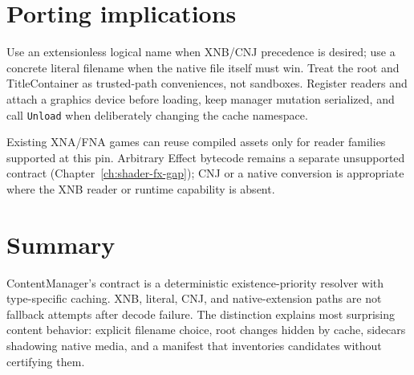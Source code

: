 \section{Porting implications}

Use an extensionless logical name when XNB/CNJ precedence is desired; use a concrete literal
filename when the native file itself must win. Treat the root and TitleContainer as trusted-path
conveniences, not sandboxes. Register readers and attach a graphics device before loading, keep
manager mutation serialized, and call \texttt{Unload} when deliberately changing the cache
namespace.

Existing XNA/FNA games can reuse compiled assets only for reader families supported at this pin.
Arbitrary Effect bytecode remains a separate unsupported contract
(Chapter~\ref{ch:shader-fx-gap}); CNJ or a native conversion is appropriate where the XNB reader
or runtime capability is absent.

\section{Summary}

ContentManager's contract is a deterministic existence-priority resolver with type-specific
caching. XNB, literal, CNJ, and native-extension paths are not fallback attempts after decode
failure. The distinction explains most surprising content behavior: explicit filename choice,
root changes hidden by cache, sidecars shadowing native media, and a manifest that inventories
candidates without certifying them.
